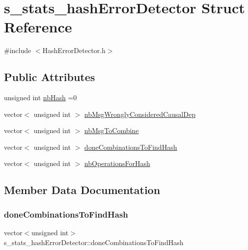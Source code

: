 \hypertarget{structs__stats__hash_error_detector}{}\section{s\+\_\+stats\+\_\+hash\+Error\+Detector Struct Reference}
\label{structs__stats__hash_error_detector}


{\ttfamily \#include $<$Hash\+Error\+Detector.\+h$>$}

\subsection*{Public Attributes}
\begin{DoxyCompactItemize}
\item 
unsigned int \hyperlink{structs__stats__hash_error_detector_a10b1af7c249bf232e739b50c5faed021}{nb\+Hash} =0
\item 
vector$<$ unsigned int $>$ \hyperlink{structs__stats__hash_error_detector_ac8f99ce678b3938dc049ff074040b999}{nb\+Msg\+Wrongly\+Considered\+Causal\+Dep}
\item 
vector$<$ unsigned int $>$ \hyperlink{structs__stats__hash_error_detector_ab765b1ecec0ec33fec5968fb28d5e4fb}{nb\+Msg\+To\+Combine}
\item 
vector$<$ unsigned int $>$ \hyperlink{structs__stats__hash_error_detector_a82622eb0b2a4d41fc33df25c6360dc79}{done\+Combinations\+To\+Find\+Hash}
\item 
vector$<$ unsigned int $>$ \hyperlink{structs__stats__hash_error_detector_a64dab27e3314cfc2a233f620f0309782}{nb\+Operations\+For\+Hash}
\end{DoxyCompactItemize}


\subsection{Member Data Documentation}
\mbox{\label{structs__stats__hash_error_detector_a82622eb0b2a4d41fc33df25c6360dc79}} 
\subsubsection{\texorpdfstring{done\+Combinations\+To\+Find\+Hash}{doneCombinationsToFindHash}}
{\footnotesize\ttfamily vector$<$unsigned int$>$ s\+\_\+stats\+\_\+hash\+Error\+Detector\+::done\+Combinations\+To\+Find\+Hash}

